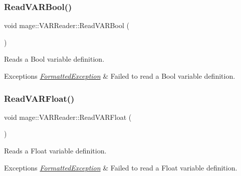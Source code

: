\subsubsection{\texorpdfstring{Read\+V\+A\+R\+Bool()}{ReadVARBool()}}
{\footnotesize\ttfamily void mage\+::\+V\+A\+R\+Reader\+::\+Read\+V\+A\+R\+Bool (\begin{DoxyParamCaption}{ }\end{DoxyParamCaption})\hspace{0.3cm}{\ttfamily [private]}}

Reads a Bool variable definition.


\begin{DoxyExceptions}{Exceptions}
{\em \hyperlink{classmage_1_1_formatted_exception}{Formatted\+Exception}} & Failed to read a Bool variable definition. \\
\hline
\end{DoxyExceptions}
\hypertarget{classmage_1_1_v_a_r_reader_a2d36a7cf1547cd795ee451c0219dd9f3}{}\label{classmage_1_1_v_a_r_reader_a2d36a7cf1547cd795ee451c0219dd9f3} 
\subsubsection{\texorpdfstring{Read\+V\+A\+R\+Float()}{ReadVARFloat()}}
{\footnotesize\ttfamily void mage\+::\+V\+A\+R\+Reader\+::\+Read\+V\+A\+R\+Float (\begin{DoxyParamCaption}{ }\end{DoxyParamCaption})\hspace{0.3cm}{\ttfamily [private]}}

Reads a Float variable definition.


\begin{DoxyExceptions}{Exceptions}
{\em \hyperlink{classmage_1_1_formatted_exception}{Formatted\+Exception}} & Failed to read a Float variable definition. \\
\hline
\end{DoxyExceptions}
\hypertarget{classmage_1_1_v_a_r_reader_a03a2cfead8f57843bb4a2c9bc8d00b67}{}\label{classmage_1_1_v_a_r_reader_a03a2cfead8f57843bb4a2c9bc8d00b67} 
